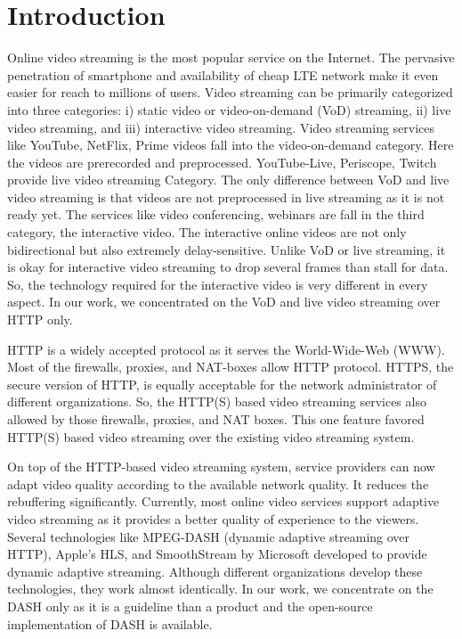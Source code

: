 \section{Introduction}
Online video streaming is the most popular service on the Internet. The pervasive penetration of smartphone and availability of cheap LTE network make it even easier for reach to millions of users.
Video streaming can be primarily categorized into three categories: i) static video or video-on-demand (VoD) streaming, ii) live video streaming, and iii) interactive video streaming. Video streaming services like YouTube, NetFlix, Prime videos fall into the video-on-demand category. Here the videos are prerecorded and preprocessed. YouTube-Live, Periscope, Twitch provide live video streaming Category. The only difference between VoD and live video streaming is that videos are not preprocessed in live streaming as it is not ready yet. The services like video conferencing, webinars are fall in the third category, the interactive video. The interactive online videos are not only bidirectional but also extremely delay-sensitive. Unlike VoD or live streaming, it is okay for interactive video streaming to drop several frames than stall for data. So, the technology required for the interactive video is very different in every aspect. In our work, we concentrated on the VoD and live video streaming over HTTP only.

HTTP is a widely accepted protocol as it serves the World-Wide-Web (WWW). Most of the firewalls, proxies, and NAT-boxes allow HTTP protocol. HTTPS, the secure version of HTTP, is equally acceptable for the network administrator of different organizations. So, the HTTP(S) based video streaming services also allowed by those firewalls, proxies, and NAT boxes. This one feature favored HTTP(S) based video streaming over the existing video streaming system.

On top of the HTTP-based video streaming system, service providers can now adapt video quality according to the available network quality. It reduces the rebuffering significantly. Currently, most online video services support adaptive video streaming as it provides a better quality of experience to the viewers. Several technologies like MPEG-DASH (dynamic adaptive streaming over HTTP), Apple's HLS, and SmoothStream by Microsoft developed to provide dynamic adaptive streaming. Although different organizations develop these technologies, they work almost identically. In our work, we concentrate on the DASH only as it is a guideline than a product and the open-source implementation of DASH is available.

